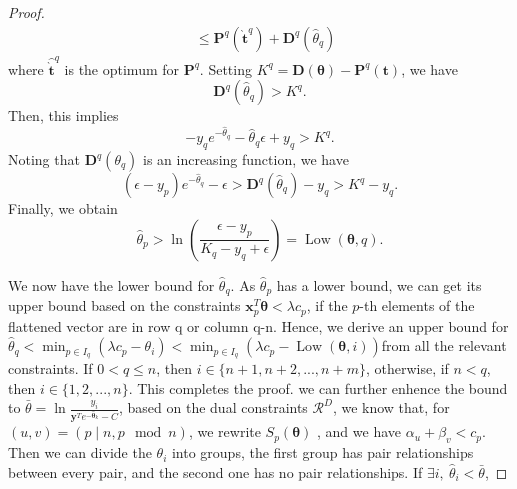 \documentclass[11pt]{article}
\newcommand{\mat}[1]{\mathbf{#1}}
\renewcommand{\vec}[1]{\bm{#1}}
\begin{document}
\begin{proof}
\begin{equation}
\begin{split}
& \leq \mat P^{q}(\grave{\vec t}^{q}) + \mat D^{q}(\hat{\theta}_q)
\end{split}
\end{equation}
where $\hat{{\grave{\vec{t}}}}^q$ is the optimum for $\mat P^{q}$. Setting $K^{q}= \mat D(\vec\theta) - \mat P^{q}({\vec{t}})$, we have
\begin{equation*}
\mat D^{q}(\hat\theta_q) > K^q.
\end{equation*}
Then, this implies
\begin{equation*}
- y_q e^{-\hat\theta_q} - \hat\theta_q \epsilon + y_q > K^q.
\end{equation*}
Noting that $\mat D^{q}(\theta_q)$ is an increasing function, we have
\begin{equation*}
(\epsilon - y_p)e^{-\hat\theta_q} - \epsilon > \mat D^{q}(\hat\theta_q)- y_q > K^q - y_q.
\end{equation*}
Finally, we obtain
\begin{equation*}
\hat\theta_p > \ln \left(\frac{\epsilon - y_p}{K_q - y_q +\epsilon}\right) = \operatorname{Low}(\vec \theta, q).
\end{equation*}

We now have the lower bound for $\hat{\theta}_q$. As $\hat\theta_p$ has a lower bound, we can get its upper bound based on the constraints $\vec x_p^{T}\vec\theta < \lambda c_p$, if the $p$-th elements of the flattened vector are in row q or column q-n. Hence, we derive an upper bound for $\hat\theta_q <\min_{p \in I_q} (\lambda c_p - \theta_i)< \min_{p \in I_q} (\lambda c_p -\operatorname{Low}(\vec \theta, i))$from all the relevant constraints. If $0< q \leq n$, then $i \in \{n+1,n+2, ..., n+m \}$, otherwise, if $n< q $, then $i \in \{1,2, ..., n \}$. This completes the proof.
\iffalse
we can further enhence the bound to $\bar\theta = \ln\frac{y_i }{\vec y^{T} e^{ - \hat {\vec \theta}_k} - C}$, based on the dual constraints $\mathcal{R}^{D}$, we know that, for $(u,v)=(p \mid n,p \mod n)$, we rewrite $S_p(\vec\theta)$ , and we have $\alpha_{u} + \beta_{v} < c_{p}$.\\
Then we can divide the $\theta_i$ into groups, the first group has pair relationships between every pair, and the second one has no pair relationships. If $\exists i, \ \hat\theta_i <\bar\theta $,


\end{proof}
\end{document}
